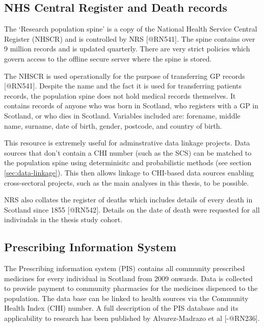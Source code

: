 \documentclass[]{article}
\begin{document}
\subsection{NHS Central Register and Death records}\label{subsec:source-nhscr}

The `Research population spine' is a copy of the National Health Service
Central Register (NHSCR) and is controlled by NRS {[}@RN541{]}. The
spine contains over 9 million records and is updated quarterly. There
are very strict policies which govern access to the offline secure
server where the spine is stored.

The NHSCR is used operationally for the purpose of transferring GP
records {[}@RN541{]}. Despite the name and the fact it is used for
transferring patients records, the population spine does not hold
medical records themselves. It contains records of anyone who was born
in Scotland, who registers with a GP in Scotland, or who dies in
Scotland. Variables included are: forename, middle name, surname, date
of birth, gender, postcode, and country of birth.

This resource is extremely useful for adminstrative data linkage
projects. Data sources that don't contain a CHI number (such as the SCS)
can be matched to the population spine using determinisitc and
probabilistic methods (see section \ref{sec:data-linkage}). This then
allows linkage to CHI-based data sources enabling cross-sectoral
projects, such as the main analyses in this thesis, to be possible.

NRS also collates the register of deaths which includes details of every
death in Scotland since 1855 {[}@RN542{]}. Details on the date of death
were requested for all indiviudals in the thesis study cohort.

\subsection{Prescribing Information System}\label{subsec:source-pis}

The Prescribing information system (PIS) contains all community
prescribed medicines for every individual in Scotland from 2009 onwards.
Data is collected to provide payment to community pharmacies for the
medicines dispenced to the population. The data base can be linked to
health sources via the Community Health Index (CHI) number. A full
description of the PIS database and its applicability to research has
been published by Alvarez-Madrazo et al {[}-@RN236{]}.
\end{document}
